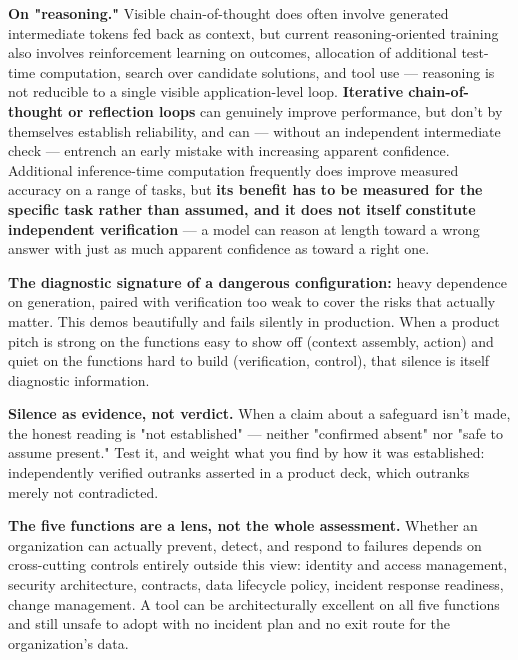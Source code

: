 \textbf{On "reasoning."} Visible chain-of-thought does often involve generated intermediate tokens fed back as context, but current reasoning-oriented training also involves reinforcement learning on outcomes, allocation of additional test-time computation, search over candidate solutions, and tool use --- reasoning is not reducible to a single visible application-level loop. \textbf{Iterative chain-of-thought or reflection loops} can genuinely improve performance, but don't by themselves establish reliability, and can --- without an independent intermediate check --- entrench an early mistake with increasing apparent confidence. Additional inference-time computation frequently does improve measured accuracy on a range of tasks, but \textbf{its benefit has to be measured for the specific task rather than assumed, and it does not itself constitute independent verification} --- a model can reason at length toward a wrong answer with just as much apparent confidence as toward a right one.

\textbf{The diagnostic signature of a dangerous configuration:} heavy dependence on generation, paired with verification too weak to cover the risks that actually matter. This demos beautifully and fails silently in production. When a product pitch is strong on the functions easy to show off (context assembly, action) and quiet on the functions hard to build (verification, control), that silence is itself diagnostic information.

\textbf{Silence as evidence, not verdict.} When a claim about a safeguard isn't made, the honest reading is "not established" --- neither "confirmed absent" nor "safe to assume present." Test it, and weight what you find by how it was established: independently verified outranks asserted in a product deck, which outranks merely not contradicted.

\textbf{The five functions are a lens, not the whole assessment.} Whether an organization can actually prevent, detect, and respond to failures depends on cross-cutting controls entirely outside this view: identity and access management, security architecture, contracts, data lifecycle policy, incident response readiness, change management. A tool can be architecturally excellent on all five functions and still unsafe to adopt with no incident plan and no exit route for the organization's data.
